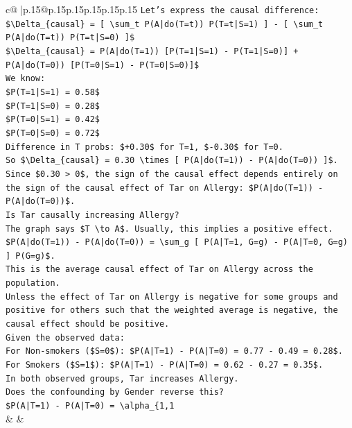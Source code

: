 \documentclass{article}
\begin{document}
{\begin{supertabular}{c@{$\;$}|p{.15\linewidth}@{}p{.15\linewidth}p{.15\linewidth}p{.15\linewidth}p{.15\linewidth}p{.15\linewidth}}
{{{\texttt{Let's express the causal difference:} \\
\texttt{\$\textbackslash{}Delta\_\{causal\} = {[} \textbackslash{}sum\_t P(A|do(T=t)) P(T=t|S=1) {]} {-} {[} \textbackslash{}sum\_t P(A|do(T=t)) P(T=t|S=0) {]}\$} \\
\texttt{\$\textbackslash{}Delta\_\{causal\} = P(A|do(T=1)) {[}P(T=1|S=1) {-} P(T=1|S=0){]} + P(A|do(T=0)) {[}P(T=0|S=1) {-} P(T=0|S=0){]}\$} \\
\texttt{We know:} \\
\texttt{\$P(T=1|S=1) = 0.58\$} \\
\texttt{\$P(T=1|S=0) = 0.28\$} \\
\texttt{\$P(T=0|S=1) = 0.42\$} \\
\texttt{\$P(T=0|S=0) = 0.72\$} \\
\texttt{Difference in T probs: \$+0.30\$ for T=1, \${-}0.30\$ for T=0.} \\
\texttt{So \$\textbackslash{}Delta\_\{causal\} = 0.30 \textbackslash{}times {[} P(A|do(T=1)) {-} P(A|do(T=0)) {]}\$.} \\
\texttt{Since \$0.30 > 0\$, the sign of the causal effect depends entirely on the sign of the causal effect of Tar on Allergy: \$P(A|do(T=1)) {-} P(A|do(T=0))\$.} \\
\texttt{Is Tar causally increasing Allergy?} \\
\texttt{The graph says \$T \textbackslash{}to A\$. Usually, this implies a positive effect.} \\
\texttt{\$P(A|do(T=1)) {-} P(A|do(T=0)) = \textbackslash{}sum\_g {[} P(A|T=1, G=g) {-} P(A|T=0, G=g) {]} P(G=g)\$.} \\
\texttt{This is the average causal effect of Tar on Allergy across the population.} \\
\texttt{Unless the effect of Tar on Allergy is negative for some groups and positive for others such that the weighted average is negative, the causal effect should be positive.} \\
\texttt{Given the observed data:} \\
\texttt{For Non{-}smokers (\$S=0\$): \$P(A|T=1) {-} P(A|T=0) = 0.77 {-} 0.49 = 0.28\$.} \\
\texttt{For Smokers (\$S=1\$): \$P(A|T=1) {-} P(A|T=0) = 0.62 {-} 0.27 = 0.35\$.} \\
\texttt{In both observed groups, Tar increases Allergy.} \\
\texttt{Does the confounding by Gender reverse this?} \\
\texttt{\$P(A|T=1) {-} P(A|T=0) = \textbackslash{}alpha\_\{1,1} \\
            }
        }
    }
    & & \\ \\


\end{supertabular}}
\end{document}
